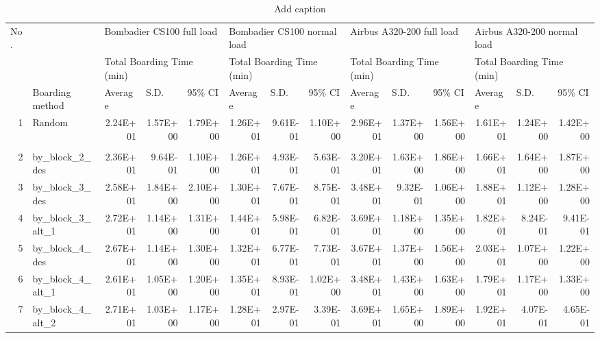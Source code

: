 \documentclass[11pt]{article}
\begin{document}
\begin{table}[htbp]
  \centering
  \caption{Add caption}
    \begin{tabular}{rlrrrrrrrrrrrr}
    \multicolumn{1}{l}{No.} &       & \multicolumn{3}{l}{Bombadier CS100 full load} & \multicolumn{3}{l}{Bombadier CS100 normal load} & \multicolumn{3}{l}{Airbus A320-200 full load} & \multicolumn{3}{l}{Airbus A320-200 normal load} \\
          &       & \multicolumn{3}{l}{Total Boarding Time (min)} & \multicolumn{3}{l}{Total Boarding Time (min)} & \multicolumn{3}{l}{Total Boarding Time (min)} & \multicolumn{3}{l}{Total Boarding Time (min)} \\
          & Boarding method & \multicolumn{1}{l}{Average} & \multicolumn{1}{l}{S.D.} & \multicolumn{1}{l}{95\% CI} & \multicolumn{1}{l}{Average} & \multicolumn{1}{l}{S.D.} & \multicolumn{1}{l}{95\% CI} & \multicolumn{1}{l}{Average} & \multicolumn{1}{l}{S.D.} & \multicolumn{1}{l}{95\% CI} & \multicolumn{1}{l}{Average} & \multicolumn{1}{l}{S.D.} & \multicolumn{1}{l}{95\% CI} \\
    1     & Random & 2.24E+01 & 1.57E+00 & 1.79E+00 & 1.26E+01 & 9.61E-01 & 1.10E+00 & 2.96E+01 & 1.37E+00 & 1.56E+00 & 1.61E+01 & 1.24E+00 & 1.42E+00 \\
          &       &       &       &       &       &       &       &       &       &       &       &       &  \\
    2     & by\_block\_2\_des & 2.36E+01 & 9.64E-01 & 1.10E+00 & 1.26E+01 & 4.93E-01 & 5.63E-01 & 3.20E+01 & 1.63E+00 & 1.86E+00 & 1.66E+01 & 1.64E+00 & 1.87E+00 \\
    3     & by\_block\_3\_des & 2.58E+01 & 1.84E+00 & 2.10E+00 & 1.30E+01 & 7.67E-01 & 8.75E-01 & 3.48E+01 & 9.32E-01 & 1.06E+00 & 1.88E+01 & 1.12E+00 & 1.28E+00 \\
    4     & by\_block\_3\_alt\_1 & 2.72E+01 & 1.14E+00 & 1.31E+00 & 1.44E+01 & 5.98E-01 & 6.82E-01 & 3.69E+01 & 1.18E+00 & 1.35E+00 & 1.82E+01 & 8.24E-01 & 9.41E-01 \\
    5     & by\_block\_4\_des & 2.67E+01 & 1.14E+00 & 1.30E+00 & 1.32E+01 & 6.77E-01 & 7.73E-01 & 3.67E+01 & 1.37E+00 & 1.56E+00 & 2.03E+01 & 1.07E+00 & 1.22E+00 \\
    6     & by\_block\_4\_alt\_1 & 2.61E+01 & 1.05E+00 & 1.20E+00 & 1.35E+01 & 8.93E-01 & 1.02E+00 & 3.48E+01 & 1.43E+00 & 1.63E+00 & 1.79E+01 & 1.17E+00 & 1.33E+00 \\
    7     & by\_block\_4\_alt\_2 & 2.71E+01 & 1.03E+00 & 1.17E+00 & 1.28E+01 & 2.97E-01 & 3.39E-01 & 3.69E+01 & 1.65E+00 & 1.89E+00 & 1.92E+01 & 4.07E-01 & 4.65E-01 \\

\end{tabular}
\end{table}
\end{document}
